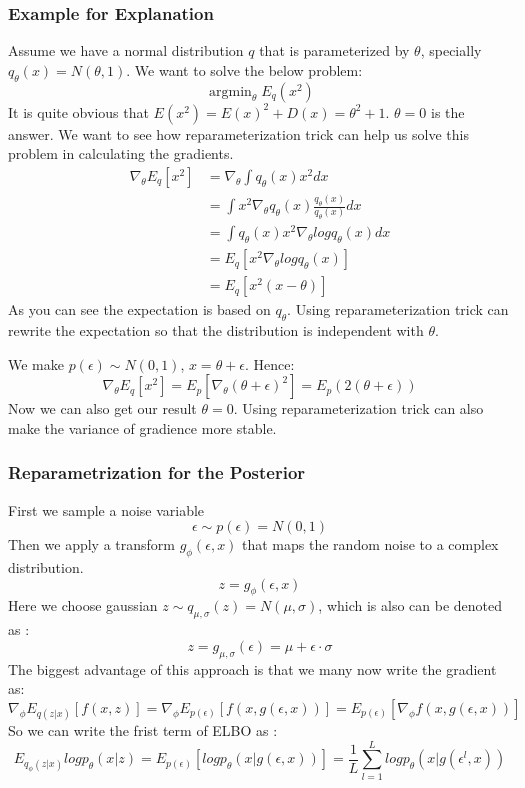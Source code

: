 \documentclass{article}
\begin{document}
\subsubsection{Example for Explanation} 
Assume we have a normal distribution $q$ that is parameterized by $\theta$, specially $q_{\theta}(x)=N(\theta,1)$. We want to solve the below problem:
$$\mathop{\arg\min}_{\theta} E_{q}(x^{2})$$
It is quite obvious that $E(x^{2})=E(x)^{2}+D(x)=\theta^{2}+1$. $\theta=0$ is the answer. We want to see how reparameterization trick can help us solve this problem in calculating the gradients. 
\begin{align*}
\nabla_{\theta}E_{q}[x^{2}]&=\nabla_{\theta} \int q_{\theta}(x)x^{2}dx \\
&=  \int x^{2} \nabla_{\theta}q_{\theta}(x) \frac{q_{\theta}(x)}{q_{\theta}(x)} dx \\
&= \int q_{\theta}(x) x^{2} \nabla_{\theta} log q_{\theta}(x) dx \\
&= E_{q}[x^{2}\nabla_{\theta} logq_{\theta}(x)] \\
&= E_{q}[x^{2}(x-\theta)]
\end{align*}
As you can see the expectation is based on $q_{\theta}$. Using reparameterization trick can rewrite the expectation so that the distribution is independent with $\theta$. 

We make $p(\epsilon) \sim N (0,1)$, $x=\theta+\epsilon$. Hence: 
$$\nabla_{\theta}E_{q}[x^{2}]=E_{p}[\nabla_{\theta}(\theta+\epsilon)^{2}]=E_{p}(2(\theta+\epsilon))$$
Now we can also get our result $\theta=0$. Using reparameterization trick can also make the variance of gradience more stable.

\subsubsection{Reparametrization for the Posterior } 
First we sample a noise variable 
$$\epsilon \sim p(\epsilon)= N(0,1)$$
Then we apply a transform $g_{\phi}(\epsilon,x)$ that maps the random noise to a complex distribution. 
$$z=g_{\phi}(\epsilon,x)$$
Here we choose gaussian $z\sim q_{\mu,\sigma}(z)=N(\mu,\sigma)$, which is also can be denoted as :
$$z=g_{\mu,\sigma}(\epsilon)=\mu+\epsilon \cdot \sigma$$
The biggest advantage of this approach is that we many now write the gradient as:
$$\nabla_{\phi}E_{q(z|x)}[f(x,z)]=\nabla_{\phi}E_{p(\epsilon)}[f(x,g(\epsilon,x))]=E_{p(\epsilon)}[\nabla_{\phi}f(x,g(\epsilon,x))]$$
So we can write the frist term of ELBO as :
$$E_{q_{\phi}(z|x)}logp_{\theta}(x|z)=E_{p(\epsilon)}[logp_{\theta}(x|g(\epsilon,x))]=\frac{1}{L}\sum_{l=1}^{L}logp_{\theta}(x|g(\epsilon^{l},x)) $$
\end{document}
